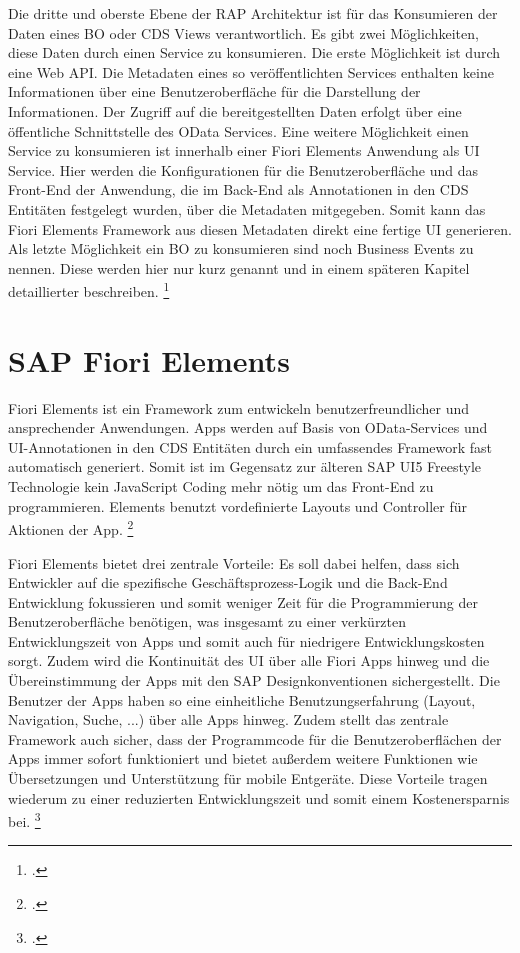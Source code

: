 Die dritte und oberste Ebene der RAP Architektur ist für das Konsumieren der Daten eines BO oder CDS Views verantwortlich. Es gibt zwei Möglichkeiten, diese Daten durch einen Service zu konsumieren. Die erste Möglichkeit ist durch eine Web API. Die Metadaten eines so veröffentlichten Services enthalten keine Informationen über eine Benutzeroberfläche für die Darstellung der Informationen. Der Zugriff auf die bereitgestellten Daten erfolgt über eine öffentliche Schnittstelle des OData Services. Eine weitere Möglichkeit einen Service zu konsumieren ist innerhalb einer Fiori Elements Anwendung als UI Service. Hier werden die Konfigurationen für die Benutzeroberfläche und das Front-End der Anwendung, die im Back-End als Annotationen in den CDS Entitäten festgelegt wurden, über die Metadaten mitgegeben. Somit kann das Fiori Elements Framework aus diesen Metadaten direkt eine fertige UI generieren. Als letzte Möglichkeit ein BO zu konsumieren sind noch Business Events zu nennen. Diese werden hier nur kurz genannt und in einem späteren Kapitel detaillierter beschreiben. \footcite[Vgl.][]{sap_rap_2023}

\section{SAP Fiori Elements}

Fiori Elements ist ein Framework zum entwickeln benutzerfreundlicher und ansprechender Anwendungen. Apps werden auf Basis von OData-Services und UI-Annotationen in den CDS Entitäten durch ein umfassendes Framework fast automatisch generiert. Somit ist im Gegensatz zur älteren SAP UI5 Freestyle Technologie kein JavaScript Coding mehr nötig um das Front-End zu programmieren. Elements benutzt vordefinierte Layouts und Controller für Aktionen der App. \footcite[Vgl.][]{sap_ui5-docu_2022}

Fiori Elements bietet drei zentrale Vorteile: Es soll dabei helfen, dass sich Entwickler auf die spezifische Geschäftsprozess-Logik und die Back-End Entwicklung fokussieren und somit weniger Zeit für die Programmierung der Benutzeroberfläche benötigen, was insgesamt zu einer verkürzten Entwicklungszeit von Apps und somit auch für niedrigere Entwicklungskosten sorgt. Zudem wird die Kontinuität des UI über alle Fiori Apps hinweg und die Übereinstimmung der Apps mit den SAP Designkonventionen sichergestellt. Die Benutzer der Apps haben so eine einheitliche Benutzungserfahrung (Layout, Navigation, Suche, ...) über alle Apps hinweg. Zudem stellt das zentrale Framework auch sicher, dass der Programmcode für die Benutzeroberflächen der Apps immer sofort funktioniert und bietet au{\ss}erdem weitere Funktionen wie Übersetzungen und Unterstützung für mobile Entgeräte. Diese Vorteile tragen wiederum zu einer reduzierten Entwicklungszeit und somit einem Kostenersparnis bei. \footcite[Vgl.][]{sap_ui5-docu_2022}


